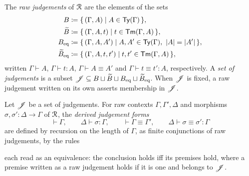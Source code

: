 \begin{definition}\label{def:raw-judgements}
    The \emph{raw judgements} of $\mathcal{R}$ are the elements of the sets
    \begin{align*}
        B &\coloneqq \{\, (\Gamma, A) \mid A \in \mathsf{Ty}(\Gamma) \,\},\\
        \widetilde{B} &\coloneqq \{\, (\Gamma, A, t) \mid t \in \mathsf{Tm}(\Gamma, A) \,\},\\
        B_{\mathrm{eq}} &\coloneqq \{\, (\Gamma, A, A') \mid A, A' \in \mathsf{Ty}(\Gamma),\ |A| = |A'| \,\},\\
        \widetilde{B}_{\mathrm{eq}} &\coloneqq \{\, (\Gamma, A, t, t') \mid t, t' \in \mathsf{Tm}(\Gamma, A) \,\},
    \end{align*}
    written $\Gamma \vdash A$, $\Gamma \vdash t : A$, $\Gamma \vdash A \equiv A'$ and $\Gamma \vdash t \equiv t' : A$, respectively. A \emph{set of judgements} is a subset $\mathscr{J} \subseteq B \sqcup \widetilde{B} \sqcup B_{\mathrm{eq}} \sqcup \widetilde{B}_{\mathrm{eq}}$. When $\mathscr{J}$ is fixed, a raw judgement written on its own asserts membership in $\mathscr{J}$.
\end{definition}

\begin{definition}\label{def:derived-forms}
    Let $\mathscr{J}$ be a set of judgements. For raw contexts $\Gamma, \Gamma', \Delta$ and morphisms $\sigma, \sigma' : \Delta \to \Gamma$ of $\mathcal{R}$, the \emph{derived judgement forms}
    \[
        {\vdash \Gamma}, \qquad \Delta \vdash \sigma : \Gamma, \qquad {\vdash \Gamma \equiv \Gamma'}, \qquad \Delta \vdash \sigma \equiv \sigma' : \Gamma
    \]
    are defined by recursion on the length of $\Gamma$, as finite conjunctions of raw judgements, by the rules
    each read as an equivalence: the conclusion holds iff its premises hold, where a premise written as a raw judgement holds if it is one and belongs to $\mathscr{J}$.
\end{definition}


